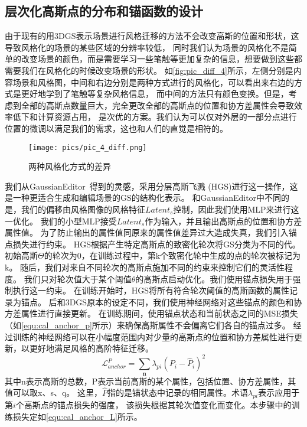 \subsection{层次化高斯点的分布和锚函数的设计}
由于现有的用3DGS表示场景进行风格迁移的方法不会改变高斯的位置和形状，这导致风格化的场景的某些区域的分辨率较低，
同时我们认为场景的风格化不是简单的改变场景的颜色，而是需要学习一些笔触等更加复杂的信息，想要做到这些都需要我们在风格化的时候改变场景的形状。
如\autoref{fig:pic_diff_4}所示，左侧分别是内容场景和风格图，中间和右边分别是两种方式进行的风格化，可以看出来右边的方式是更好地学到了笔触等复杂风格信息，
而中间的方法只有颜色变换。但是，考虑到全部的高斯点数量巨大，完全更改全部的高斯点的位置和协方差属性会导致效率低下和计算资源占用，
是次优的方案。我们认为可以仅对外层的一部分点进行位置的微调以满足我们的需求，这也和人们的直觉是相符的。
\begin{figure}[htb]
    \centering
    \texttt{[image: pics/pic\_4\_diff.png]}
    \caption{\label{fig:pic_diff_4}两种风格化方式的差异}
\end{figure}
我们从GaussianEditor~\cite{chen2024gaussianeditor}得到的灵感，采用分层高斯飞溅 (HGS)进行这一操作，这是一种更适合生成和编辑场景的GS的结构化表示。
和GaussianEditor中不同的是，我们的偏移由风格图像的风格特征$Latent_s$控制，因此我们使用MLP来进行这一优化。
我们的小型MLP接受$Latent_s$作为输入，并且输出高斯点的位置和协方差属性值。
为了防止输出的属性值同原来的属性值差异过大造成失真，我们引入锚点损失进行约束。
HGS根据产生特定高斯点的致密化轮次将GS分类为不同的代。
初始高斯$\Theta$的轮次为0，在训练过程中，第k个致密化轮中生成的点的轮次被标记为k。
随后，我们对来自不同轮次的高斯点施加不同的约束来控制它们的灵活性程度。
我们只对轮次值大于某个阈值$\theta$的高斯点启动优化。我们使用锚点损失用于强制执行这一约束。
在训练开始时，HGS将所有符合轮次阈值的高斯函数的属性记录为锚点。
后和3DGS原本的设定不同，我们使用神经网络对这些锚点的颜色和协方差属性进行直接更新。
在训练期间，使用锚点状态和当前状态之间的MSE损失（如\autoref{equ:cal_anchor_p}所示）来确保高斯属性不会偏离它们各自的锚点过多。
经过训练的神经网络可以在小幅度范围内对少量的高斯点的位置和协方差属性进行更新，以更好地满足风格的高阶特征迁移。
\begin{equation}
    \label{equ:cal_anchor_p}
    \mathcal{L}_{anchor}^P=\sum_{\mathbf{n}}\lambda_{pi}(P_i-\widehat{P}_i)^2
\end{equation}
其中n表示高斯的总数，P表示当前高斯的某个属性，包括位置、协方差属性，其值可以取x、s、q。
这里，$\widehat{P}$指的是锚状态中记录的相同属性。术语$\lambda_{pi}$表示应用于第$i$个高斯点的锚点损失的强度，
该损失根据其轮次值变化而变化。本步骤中的训练损失定如\autoref{equ:cal_anchor_L}所示。

